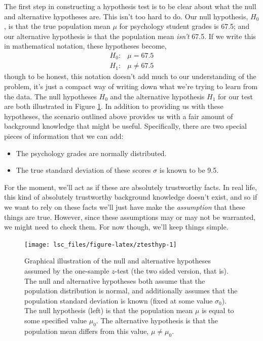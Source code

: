 \documentclass[
  11pt,
  a4paper,
  twoside,symmetric,openright]{book}
\providecommand{\tightlist}{%
  \setlength{\itemsep}{0pt}\setlength{\parskip}{0pt}}
\theoremstyle{break}
\theoremstyle{break}
\begin{document}
The first step in constructing a hypothesis test is to be clear about what the null and alternative hypotheses are. This isn't too hard to do. Our null hypothesis, \(H_0\), is that the true population mean \(\mu\) for psychology student grades is 67.5; and our alternative hypothesis is that the population mean \emph{isn't} 67.5. If we write this in mathematical notation, these hypotheses become,
\[
\begin{array}{ll}
H_0: & \mu = 67.5 \\
H_1: & \mu \neq 67.5
\end{array}
\]
though to be honest, this notation doesn't add much to our understanding of the problem, it's just a compact way of writing down what we're trying to learn from the data. The null hypotheses \(H_0\) and the alternative hypothesis \(H_1\) for our test are both illustrated in Figure \ref{fig:ztesthyp}. In addition to providing us with these hypotheses, the scenario outlined above provides us with a fair amount of background knowledge that might be useful. Specifically, there are two special pieces of information that we can add:

\begin{itemize}
\tightlist
\item
  The psychology grades are normally distributed.
\item
  The true standard deviation of these scores \(\sigma\) is known to be 9.5.
\end{itemize}

For the moment, we'll act as if these are absolutely trustworthy facts. In real life, this kind of absolutely trustworthy background knowledge doesn't exist, and so if we want to rely on these facts we'll just have make the \emph{assumption} that these things are true. However, since these assumptions may or may not be warranted, we might need to check them. For now though, we'll keep things simple.

\begin{figure}

{\centering \texttt{[image: lsc\_files/figure-latex/ztesthyp-1]} 

}

\caption{Graphical illustration of the null and alternative hypotheses assumed by the one-sample $z$-test (the two sided version, that is). The null and alternative hypotheses both assume that the population distribution is normal, and additionally assumes that the population standard deviation is known (fixed at some value $\sigma_0$). The null hypothesis (left) is that the population mean $\mu$ is equal to some specified value $\mu_0$. The alternative hypothesis is that the population mean differs from this value, $\mu \neq \mu_0$.}\label{fig:ztesthyp}
\end{figure}
\end{document}
